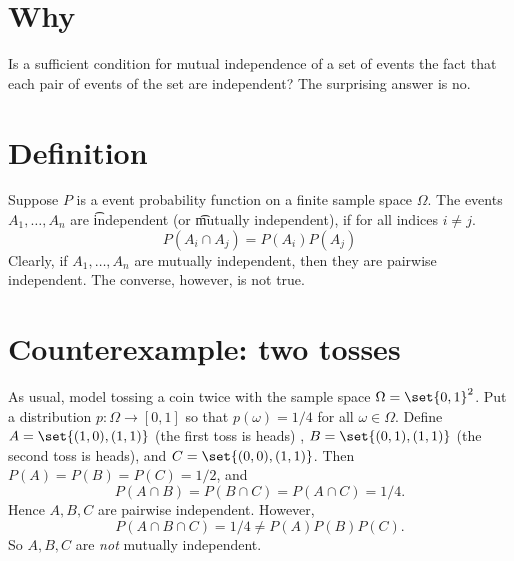 
\section*{Why}

Is a sufficient condition for mutual independence of a set of events the fact that each pair of events of the set are independent?
The surprising answer is no.

\section*{Definition}

Suppose $P$ is a event probability function on a finite sample space $\Omega $.
The events $A_1, \dots , A_n$ are \t{independent} (or \t{mutually independent}), if for all indices $i \neq j$.
\[
P(A_{i} \cap  A_{j})
=
P(A_{i}) P(A_{j})
\]
Clearly, if $A_1, \dots , A_n$ are mutually independent, then they are pairwise independent.
The converse, however, is not true.

\section*{Counterexample: two tosses}

As usual, model tossing a coin twice with the sample space $\Omega  = \set{0,1}^2$.
Put a distribution $p: \Omega  \to [0,1]$ so that $p(\omega ) = 1/4$ for all $\omega  \in \Omega $.
Define $A = \set{(1,0),(1,1)}$ (the first toss is heads) , $B = \set{(0,1),(1,1)}$ (the second toss is heads), and $C = \set{(0,0),(1,1)}$.
Then $P(A) = P(B) = P(C) = 1/2$, and
\[
P(A \cap  B) = P(B \cap  C) = P(A \cap  C) = 1/4.
\]
Hence $A, B, C$ are pairwise independent.
However,
\[
P(A \cap  B \cap  C) = 1/4 \neq P(A)P(B)P(C).
\]
So $A, B, C$ are \textit{not} mutually independent.

\blankpage